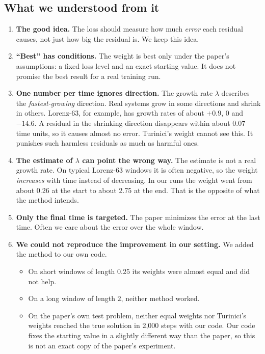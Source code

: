 \documentclass[11pt,a4paper]{article}
\begin{document}
\subsection{What we understood from it}
\begin{enumerate}
\item \textbf{The good idea.} The loss should measure how much \emph{error} each residual
  causes, not just how big the residual is. We keep this idea.
\item \textbf{``Best'' has conditions.} The weight is best only under the paper's
  assumptions: a fixed loss level and an exact starting value. It does not promise the
  best result for a real training run.
\item \textbf{One number per time ignores direction.} The growth rate $\lambda$ describes
  the \emph{fastest-growing} direction. Real systems grow in some directions and shrink in
  others. Lorenz-63, for example, has growth rates of about $+0.9$, $0$ and $-14.6$. A
  residual in the shrinking direction disappears within about $0.07$ time units, so it
  causes almost no error. Turinici's weight cannot see this. It punishes such harmless
  residuals as much as harmful ones.
\item \textbf{The estimate of $\lambda$ can point the wrong way.} The estimate is not a real
  growth rate. On typical Lorenz-63 windows it is often negative, so the weight
  \emph{increases} with time instead of decreasing. In our runs the weight went from
  about 0.26 at the start to about 2.75 at the end. That is the opposite of what the method
  intends.
\item \textbf{Only the final time is targeted.} The paper minimizes the error at the last
  time. Often we care about the error over the whole window.
\item \textbf{We could not reproduce the improvement in our setting.} We added the method to
  our own code.
  \begin{itemize}
  \item On short windows of length $0.25$ its weights were almost equal and did not help.
  \item On a long window of length $2$, neither method worked.
  \item On the paper's own test problem, neither equal weights nor Turinici's weights reached
    the true solution in 2{,}000 steps with our code. Our code fixes the starting value in a
    slightly different way than the paper, so this is not an exact copy of the paper's
    experiment.
  \end{itemize}
\end{enumerate}
\end{document}
